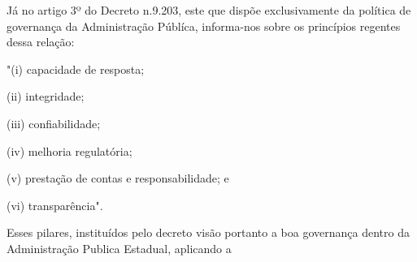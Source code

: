 Já no artigo 3º do Decreto n.9.203, este que dispõe exclusivamente da política de governança da Administração Públíca, informa-nos sobre os princípios regentes dessa relação: 

"(i) capacidade de resposta;

(ii) integridade;

(iii) confiabilidade;

(iv) melhoria regulatória;

(v) prestação de contas e responsabilidade; e

(vi) transparência".

Esses pilares, instituídos pelo decreto visão portanto a boa governança dentro da Administração Publica Estadual, aplicando a 
